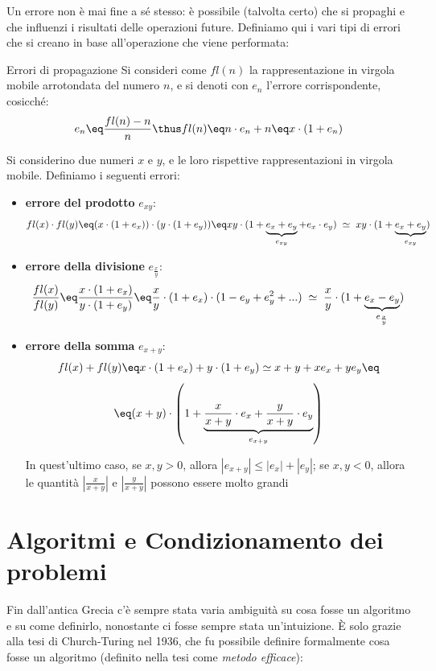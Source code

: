 Un errore non è mai fine a sé stesso: è possibile (talvolta certo) che si propaghi e che influenzi i risultati delle operazioni future. Definiamo qui i vari tipi di errori che si creano in base all'operazione che viene performata:
\begin{definition}{Errori di propagazione}
    Si consideri come $fl(n)$ la rappresentazione in virgola mobile arrotondata del numero $n$, e si denoti con $e_n$ l'errore corrispondente, cosicché:
    \[ e_n \eq \frac{fl(n) - n}{n} \thus fl(n) \eq n \cdot e_n + n \eq x \cdot (1 + e_n) \]

    Si considerino due numeri $x$ e $y$, e le loro rispettive rappresentazioni in virgola mobile. Definiamo i seguenti errori:
    \begin{itemize}
        \item \textbf{errore del prodotto} $e_{xy}$:
        \[ fl(x) \cdot fl(y) \eq (x \cdot (1 + e_x)) \cdot (y \cdot (1 + e_y)) \eq xy \cdot (1 + \underbrace{e_x + e_y}_{e_{xy}} + e_x \cdot e_y) \; \simeq \; xy \cdot (1 + \underbrace{e_x + e_y}_{e_{xy}}) \]

        \item \textbf{errore della divisione} $e_{\frac{x}{y}}$:
        \[ \frac{fl(x)}{fl(y)} \eq \frac{x \cdot (1 + e_x)}{y \cdot (1 + e_y)} \eq \frac{x}{y} \cdot (1 + e_x) \cdot (1 - e_y + e^2_y + ...) \; \simeq \; \frac{x}{y} \cdot (1 + \underbrace{e_x - e_y}_{e_{\frac{x}{y}}}) \]

        \item \textbf{errore della somma} $e_{x+y}$:
        \[ fl(x) + fl(y) \eq x \cdot(1 + e_x) + y \cdot (1 + e_y) \simeq x + y + xe_x + ye_y \eq \]
        \[ \eq (x + y) \cdot \left(1 + \underbrace{\frac{x}{x + y} \cdot e_x + \frac{y}{x + y} \cdot e_y}_{e_{x+y}} \right) \]

        In quest'ultimo caso, se $x, y > 0$, allora $|e_{x+y}| \leq |e_x| + |e_y|$; se $x, y < 0$, allora le quantità $\left|\frac{x}{x + y}\right|$ e $\left|\frac{y}{x + y}\right|$ possono essere molto grandi
    \end{itemize}
\end{definition}

\section{Algoritmi e Condizionamento dei problemi}

Fin dall'antica Grecia c'è sempre stata varia ambiguità su cosa fosse un algoritmo e su come definirlo, nonostante ci fosse sempre stata un'intuizione. È solo grazie alla tesi di Church-Turing nel 1936, che fu possibile definire formalmente cosa fosse un algoritmo (definito nella tesi come \textit{metodo efficace}):

